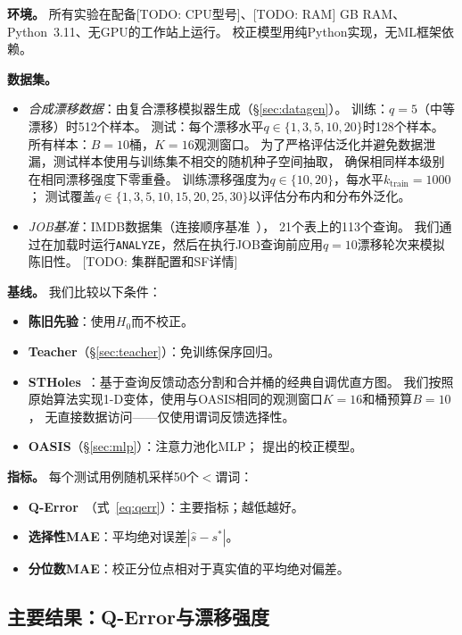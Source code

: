 \documentclass[runningheads]{llncs}
\begin{document}
\textbf{环境。}
所有实验在配备[TODO: CPU型号]、[TODO: RAM] GB RAM、Python~3.11、无GPU的工作站上运行。
校正模型用纯Python实现，无ML框架依赖。

\textbf{数据集。}
\begin{itemize}
  \item \textit{合成漂移数据}：由复合漂移模拟器生成（\S\ref{sec:datagen}）。
        训练：$q{=}5$（中等漂移）时512个样本。
        测试：每个漂移水平$q \in \{1, 3, 5, 10, 20\}$时128个样本。
         所有样本：$B{=}10$桶，$K{=}16$观测窗口。
         为了严格评估泛化并避免数据泄漏，测试样本使用与训练集不相交的随机种子空间抽取，
         确保相同样本级别在相同漂移强度下零重叠。
         训练漂移强度为$q{\in}\{10,20\}$，每水平$k_{\text{train}}{=}1000$；
         测试覆盖$q{\in}\{1,3,5,10,15,20,25,30\}$以评估分布内和分布外泛化。
  \item \textit{JOB基准}：IMDB数据集（连接顺序基准~\cite{leis2015good}），
        21个表上的113个查询。
        我们通过在加载时运行\texttt{ANALYZE}，然后在执行JOB查询前应用$q{=}10$漂移轮次来模拟陈旧性。
        [TODO: 集群配置和SF详情]
\end{itemize}

\textbf{基线。}
我们比较以下条件：
\begin{itemize}
  \item \textbf{陈旧先验}：使用$H_0$而不校正。
  \item \textbf{Teacher}（\S\ref{sec:teacher}）：免训练保序回归。
  \item \textbf{STHoles}~\cite{aboulnaga1999self}：基于查询反馈动态分割和合并桶的经典自调优直方图。
        我们按照原始算法实现1-D变体，使用与OASIS相同的观测窗口$K{=}16$和桶预算$B{=}10$，
        无直接数据访问——仅使用谓词反馈选择性。
  \item \textbf{OASIS}（\S\ref{sec:mlp}）：注意力池化MLP；
        提出的校正模型。
\end{itemize}

\textbf{指标。}
每个测试用例随机采样50个$<$谓词：
\begin{itemize}
  \item \textbf{Q-Error}\ （式~\ref{eq:qerr}）：主要指标；越低越好。
  \item \textbf{选择性MAE}：平均绝对误差$|\hat{s} - s^*|$。
  \item \textbf{分位数MAE}：校正分位点相对于真实值的平均绝对偏差。
\end{itemize}

\subsection{主要结果：Q-Error与漂移强度}
\label{sec:main_results}
\end{document}
